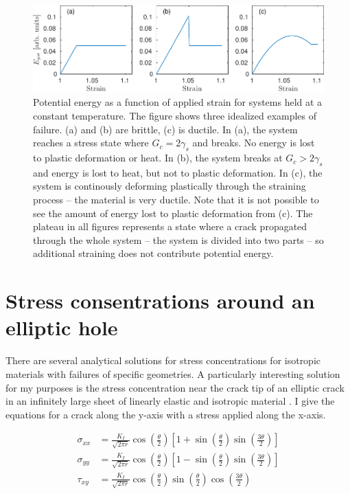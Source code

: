 \begin{figure}
\centering
\includegraphics[width=\textwidth]{../figures/thesis/idealized_fracture_e_pot.pdf}
\caption{Potential energy as a function of applied strain for systems held at a constant temperature. The figure shows three idealized examples of failure. (a) and (b) are brittle, (c) is ductile. In (a), the system reaches a stress state where $G_c = 2\gamma_s$ and breaks. No energy is lost to plastic deformation or heat. In (b), the system breaks at $G_c > 2\gamma_s$ and energy is lost to heat, but not to plastic deformation. In (c), the system is continously deforming plastically through the straining process -- the material is very ductile. Note that it is not possible to see the amount of energy lost to plastic deformation from (c). The plateau in all figures represents a state where a crack propagated through the whole system -- the system is divided into two parts -- so additional straining does not contribute potential energy. }
\end{figure}

\section{Stress consentrations around an elliptic hole}
There are several analytical solutions for stress concentrations for isotropic materials with failures of specific geometries. A particularly interesting solution for my purposes is the stress concentration near the crack tip of an elliptic crack in an infinitely large sheet of linearly elastic and isotropic material \cite{Anderson2005}. I give the equations for a crack along the y-axis with a stress applied along the x-axis.

\begin{align}
	\sigma_{xx} & =  \frac{K_I}{\sqrt{2\pi r}} \cos\left(\frac{\theta}{2}\right) \left[ 1+\sin\left(\frac{\theta}{2} \right)\sin\left( \frac{3\theta}{2}\right)\right]\\
	\sigma_{yy} & =  \frac{K_I}{\sqrt{2\pi r}} \cos\left(\frac{\theta}{2}\right) \left[ 1-\sin\left(\frac{\theta}{2} \right)\sin\left( \frac{3\theta}{2}\right)\right]\\	
	\tau_{xy} & =  \frac{K_I}{\sqrt{2\pi r}} \cos\left(\frac{\theta}{2}\right)\sin\left(\frac{\theta}{2} \right)\cos\left( \frac{3\theta}{2}\right)
\end{align}

